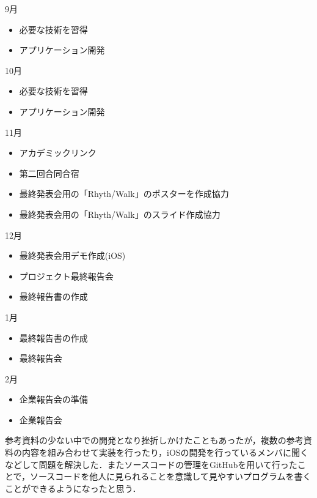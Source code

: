 9月 
\begin{itemize}
\item 必要な技術を習得
\item アプリケーション開発
\end{itemize}
10月
\begin{itemize}
\item 必要な技術を習得
\item アプリケーション開発
\end{itemize}
11月
\begin{itemize}
\item アカデミックリンク
\item 第二回合同合宿
\item 最終発表会用の「Rhyth/Walk」のポスターを作成協力
\item 最終発表会用の「Rhyth/Walk」のスライド作成協力
\end{itemize}
12月
\begin{itemize}
\item 最終発表会用デモ作成(iOS)
\item プロジェクト最終報告会
\item 最終報告書の作成
\end{itemize}
1月
\begin{itemize}
\item 最終報告書の作成
\item 最終報告会
\end{itemize}
2月
\begin{itemize}
\item 企業報告会の準備
\item 企業報告会
\end{itemize}

参考資料の少ない中での開発となり挫折しかけたこともあったが，複数の参考資料の内容を組み合わせて実装を行ったり，iOSの開発を行っているメンバに聞くなどして問題を解決した．またソースコードの管理をGitHubを用いて行ったことで，ソースコードを他人に見られることを意識して見やすいプログラムを書くことができるようになったと思う．

